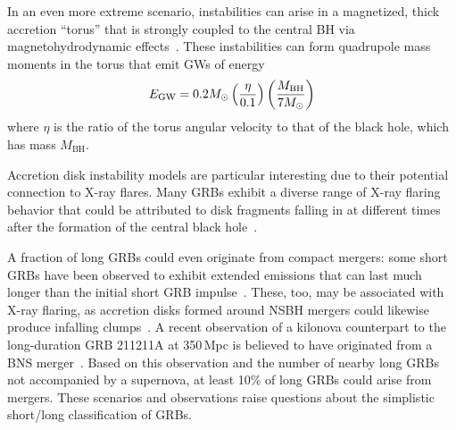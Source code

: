 In an even more extreme scenario, instabilities can arise in a magnetized, thick accretion ``torus'' that is strongly coupled to the central BH via magnetohydrodynamic effects~\citep{vanPutten_2001, vanPutten_2004}.
These instabilities can form quadrupole mass moments in the torus that emit GWs of energy
\begin{equation}
	E_{\mathrm{GW}} = 0.2 M_{\odot} \left(\frac{\eta}{0.1}\right) \left(\frac{M_{\mathrm{BH}}}{7M_{\odot}} \right)
\end{equation}
where $\eta$ is the ratio of the torus angular velocity to that of the black hole, which has mass $M_{\mathrm{BH}}$.

Accretion disk instability models are particular interesting due to their potential connection to X-ray flares.
Many GRBs exhibit a diverse range of X-ray flaring behavior that could be attributed to disk fragments falling in at different times after the formation of the central black hole~\citep{Perna_2006, Dallosso_2017}.

A fraction of long GRBs could even originate from compact mergers: some short GRBs have been observed to exhibit extended emissions that can last much longer than the initial short GRB impulse~\citep{Norris_2006, vanPutten_2014}.
These, too, may be associated with X-ray flaring, as accretion disks formed around NSBH mergers could likewise produce infalling clumps~\citep{Mu_2018}.
A recent observation of a kilonova counterpart to the long-duration GRB 211211A at 350\,Mpc is believed to have originated from a BNS merger~\citep{Rastinejad_2022}.
Based on this observation and the number of nearby long GRBs not accompanied by a supernova, at least 10\% of long GRBs could arise from mergers.
These scenarios and observations raise questions about the simplistic short/long classification of GRBs.
